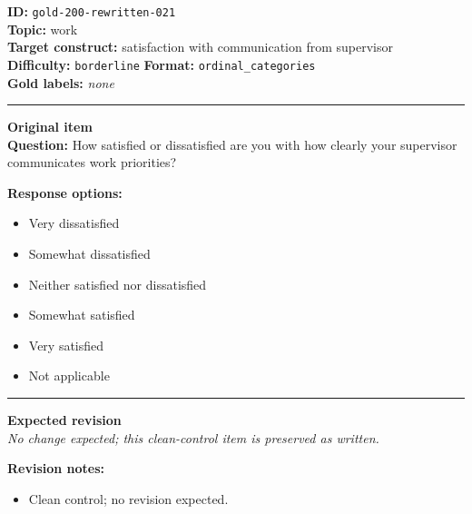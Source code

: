 \documentclass[10pt,a4paper]{article}
\newcommand{\sectionline}{\vspace{0.15em}\hrule\vspace{0.35em}}
\begin{document}
\begin{tcolorbox}[colframe=CleanGreen,colback=white,colbacktitle=CleanGreen!9,coltitle=black,title={Item 021\hfill Clean control}]
\textbf{ID:} \texttt{gold-200-rewritten-021}\\
\textbf{Topic:} work\\
\textbf{Target construct:} satisfaction with communication from supervisor\\
\textbf{Difficulty:} \texttt{borderline} \quad \textbf{Format:} \texttt{ordinal\_categories}\\
\textbf{Gold labels:} \textit{none}\\
\sectionline
\textbf{Original item}\\
\textbf{Question:} How satisfied or dissatisfied are you with how clearly your supervisor communicates work priorities?
\par\textbf{Response options:}
\begin{itemize}
\item Very dissatisfied
\item Somewhat dissatisfied
\item Neither satisfied nor dissatisfied
\item Somewhat satisfied
\item Very satisfied
\item Not applicable
\end{itemize}
\sectionline
\textbf{Expected revision}\\
\textit{No change expected; this clean-control item is preserved as written.}
\par\textbf{Revision notes:}
\begin{itemize}
\item Clean control; no revision expected.
\end{itemize}
\end{tcolorbox}
\end{document}
